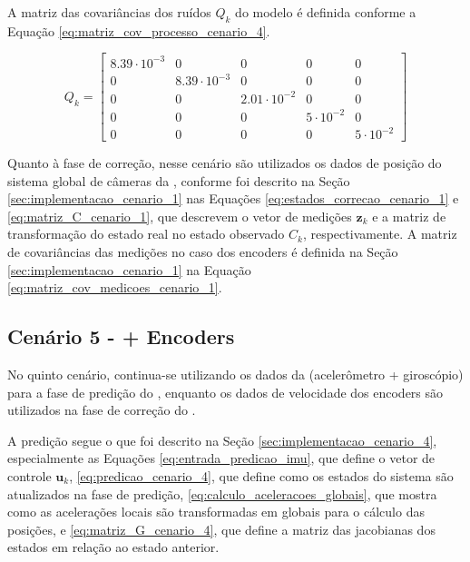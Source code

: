 \documentclass[acronym, symbols, table, deposito]{fei}
\begin{document}
			A matriz das covariâncias dos ruídos $Q_{k}$ do modelo é definida conforme a Equação \eqref{eq:matriz_cov_processo_cenario_4}.
		
			\begin{equation}\label{eq:matriz_cov_processo_cenario_4}
				Q_{k} = \begin{bmatrix}
					8.39\cdot10^{-3} & 0 & 0 & 0 & 0 \\
					0 & 8.39\cdot10^{-3} & 0 & 0 & 0 \\
					0 & 0 & 2.01\cdot10^{-2} & 0 & 0 \\
					0 & 0 & 0 & 5\cdot10^{-2} & 0 \\
					0 & 0 & 0 & 0 & 5\cdot10^{-2}
				\end{bmatrix}
			\end{equation}

			 Quanto à fase de correção, nesse cenário são utilizados os dados de posição do sistema global de câmeras da , conforme foi descrito na Seção \ref{sec:implementacao_cenario_1} nas Equações \eqref{eq:estados_correcao_cenario_1} e \eqref{eq:matriz_C_cenario_1}, que descrevem o vetor de medições $\textbf{z}_{k}$ e a matriz de transformação do estado real no estado observado $C_{k}$, respectivamente. A matriz de covariâncias das medições no caso dos encoders é definida na Seção \ref{sec:implementacao_cenario_1} na Equação \eqref{eq:matriz_cov_medicoes_cenario_1}.
		
		\subsection{Cenário 5 -  + Encoders} \label{sec:implementacao_cenario_5}
			
			No quinto cenário, continua-se utilizando os dados da  (acelerômetro + giroscópio) para a fase de predição do , enquanto os dados de velocidade dos encoders são utilizados na fase de correção do .
			
			A predição segue o que foi descrito na Seção \ref{sec:implementacao_cenario_4}, especialmente as Equações \eqref{eq:entrada_predicao_imu}, que define o vetor de controle $\textbf{u}_k$, \eqref{eq:predicao_cenario_4}, que define como os estados do sistema são atualizados na fase de predição, \eqref{eq:calculo_aceleracoes_globais}, que mostra como as acelerações locais são transformadas em globais para o cálculo das posições, e \eqref{eq:matriz_G_cenario_4}, que define a matriz das jacobianas dos estados em relação ao estado anterior.
	
\end{document}
